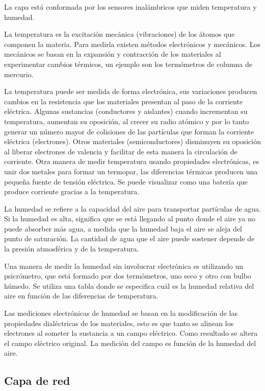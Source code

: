 		La capa está conformada por los sensores inalámbricos que miden temperatura y humedad.
		
		La temperatura es la excitación mecánica (vibraciones) de los átomos que componen la materia. Para medirla existen métodos electrónicos y mecánicos. Los mecánicos se basan en la expansión y contracción de los materiales al experimentar cambios térmicos, un ejemplo son los termómetros de columna de mercurio.
		
		La temperatura puede ser medida de forma electrónica, sus variaciones producen cambios en la resistencia que los materiales presentan al paso de la corriente eléctrica. Algunas sustancias (conductores y aislantes) cuando incrementan su temperatura, aumentan su oposición, al crecer su radio atómico y por lo tanto generar un número mayor de colisiones de las partículas que forman la corriente eléctrica (electrones). Otros materiales (semiconductores) disminuyen su oposición al liberar electrones de valencia y facilitar de esta manera la circulación de corriente. Otra manera de medir temperatura usando propiedades electrónicas, es unir dos metales para formar un termopar, las diferencias térmicas producen una pequeña fuente de tensión eléctrica. Se puede visualizar como una batería que produce corriente gracias a la temperatura.
		
		La humedad se refiere a la capacidad del aire para transportar partículas de agua. Si la humedad es alta, significa que se está llegando al punto donde el aire ya no puede absorber más agua, a medida que la humedad baja el aire se aleja del punto de saturación. La cantidad de agua que el aire puede sostener depende de la presión atmosférica y de la temperatura.
		
		Una manera de medir la humedad sin involucrar electrónica es utilizando un psicrómetro, que está formado por dos termómetros, uno seco y otro con bulbo húmedo. Se utiliza una tabla donde se especifica cuál es la humedad relativa del aire en función de las diferencias de temperatura.
		
		Las mediciones electrónicas de humedad se basan en la modificación de las propiedades dialéctricas de los materiales, esto es que tanto se alinean los electrones al someter la sustancia a un campo eléctrico. Como resultado se altera el campo eléctrico original. La medición del campo es función de la humedad del aire.
		
	\subsection{Capa de red}
	\label{capaRed}
	
